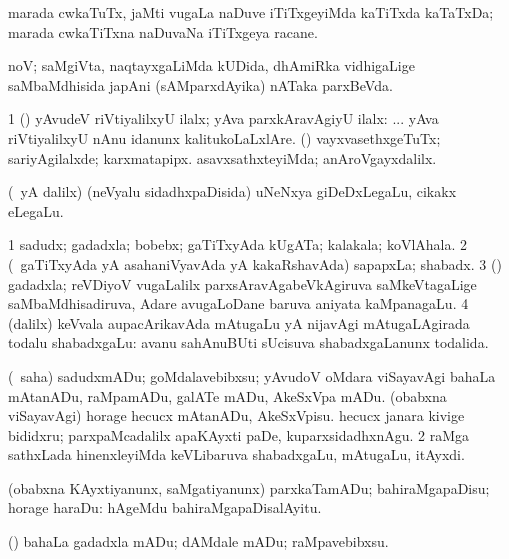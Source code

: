 \bentry
{}
\gl{\nA}
\bmng
marada cwkaTuTx, jaMti \mo vugaLa naDuve iTiTxgeyiMda kaTiTxda kaTaTxDa; marada cwkaTiTxna naDuvaNa iTiTxgeya racane. 
\emng
\eentry

\bentry
{}
\gl{\nA}
\bmng
noV; saMgiVta, naqtayxgaLiMda kUDida, dhAmiRka vidhigaLige saMbaMdhisida japAni (sAMparxdAyika) nATaka parxBeVda. 
\emng
\eentry

\bentry
{}
\gl{\kirxvi}
\bmng
\bnum
\num{1} (\ame) yAvudeV riVtiyalilxyU ilalx; yAva parxkAravAgiyU ilalx: ... yAva riVtiyalilxyU nAnu idanunx kalitukoLaLxlAre. 
 (\pArxM) 
\banum
{} vayxvasethxgeTuTx; sariyAgilalxde; karxmatapipx. 
 asavxsathxteyiMda; anAroVgayxdalilx. 
\eanum
\numie
\enum
\emng
\eentry

\bentry
{}
\gl{\nA}
\bmng
(\Eva\ yA \bava dalilx) (neVyalu sidadhxpaDisida) uNeNxya giDeDxLegaLu, cikakx eLegaLu. 
\emng
\eentry

\bentry
{}
\gl{\nA}
\bmng
\bnum
\num{1} sadudx; gadadxla; bobebx; gaTiTxyAda kUgATa; kalakala; koVlAhala. 
\num{2} (\kanmu\ gaTiTxyAda yA asahaniVyavAda yA kakaRshavAda) sapapxLa; shabadx. 
\num{3} (\Bwvi) gadadxla; reVDiyoV \mo vugaLalilx parxsAravAgabeVkAgiruva saMkeVtagaLige saMbaMdhisadiruva, Adare avugaLoDane baruva aniyata kaMpanagaLu. 
\num{4} (\bava dalilx) keVvala aupacArikavAda mAtugaLu yA nijavAgi mAtugaLAgirada todalu shabadxgaLu:  avanu sahAnuBUti sUcisuva shabadxgaLanunx todalida. 
\enum
\emng

\noindent
\gl{\pagu}
\bmng
\bnum
{}  (\rUpa\ saha) 
\banum
{} sadudxmADu; goMdalavebibxsu; yAvudoV oMdara viSayavAgi bahaLa mAtanADu, raMpamADu, galATe mADu, AkeSxVpa mADu. 
 (obabxna viSayavAgi) horage hecucx mAtanADu, AkeSxVpisu. 
 hecucx janara kivige bididxru; parxpaMcadalilx apaKAyxti paDe, kuparxsidadhxnAgu. 
\eanum
\numie
\num{2}  raMga sathxLada hinenxleyiMda keVLibaruva shabadxgaLu, mAtugaLu, itAyxdi. 
\enum
\emng
\eentry

\bentry
{}
\gl{\sakirx}
\bmng
(obabxna KAyxtiyanunx, saMgatiyanunx) parxkaTamADu; bahiraMgapaDisu; horage haraDu:  hAgeMdu bahiraMgapaDisalAyitu. 
\emng

\noindent
\gl{\akirx}
\bmng
(\pArxparx) bahaLa gadadxla mADu; dAMdale mADu; raMpavebibxsu. 
\emng
\eentry

